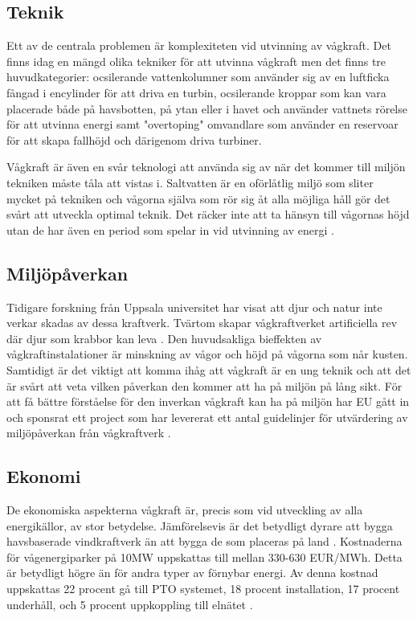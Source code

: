 \documentclass[10pt,a4paper,oneside]{article}
\begin{document}
\subsection{Teknik}
Ett av de centrala problemen är komplexiteten vid utvinning av vågkraft. Det finns idag en mängd olika tekniker för att utvinna vågkraft men det finns tre huvudkategorier:  ocsilerande vattenkolumner som använder sig av en luftficka fångad i encylinder för att driva en turbin, ocsilerande kroppar som kan vara placerade både på havsbotten, på ytan eller i havet och använder vattnets rörelse för att utvinna energi samt "overtoping" omvandlare som använder en reservoar för att skapa fallhöjd och därigenom driva turbiner.

Vågkraft är även en svår teknologi att använda sig av när det kommer till miljön tekniken måste tåla att vistas i. Saltvatten är en oförlåtlig miljö som sliter mycket på tekniken och vågorna själva som rör sig åt alla möjliga håll gör det svårt att utveckla optimal teknik. Det räcker inte att ta hänsyn till vågornas höjd utan de har även en period som spelar in vid utvinning av energi \cite{Yale}.


\subsection{Miljöpåverkan}
Tidigare forskning från Uppsala universitet har visat att djur och natur inte verkar skadas av dessa kraftverk. Tvärtom skapar vågkraftverket artificiella rev där djur som krabbor kan leva \cite{Vattenfall}. Den huvudsakliga bieffekten av vågkraftinstalationer är minskning av vågor och höjd på vågorna som når kusten. Samtidigt är det viktigt att komma ihåg att vågkraft är en ung teknik och att det är svårt att veta vilken påverkan den kommer att ha på miljön på lång sikt. För att få bättre förståelse för den inverkan vågkraft kan ha på miljön har EU gått in och sponsrat ett project som har levererat ett antal guidelinjer för utvärdering av miljöpåverkan från vågkraftverk \cite{IRENA}. 

\subsection{Ekonomi}
De ekonomiska aspekterna vågkraft är, precis som vid utveckling av alla energikällor, av stor betydelse. Jämförelsevis är det betydligt dyrare att bygga havsbaserade vindkraftverk än att bygga de som placeras på land \cite{Yale}. 
Kostnaderna för vågenergiparker på 10MW uppskattas till mellan 330-630 EUR/MWh. Detta är betydligt högre än för andra typer av förnybar energi. Av denna kostnad uppskattas 22 procent gå till PTO systemet, 18 procent installation, 17 procent underhåll, och 5 procent uppkoppling till elnätet \cite{IRENA}.
\end{document}
